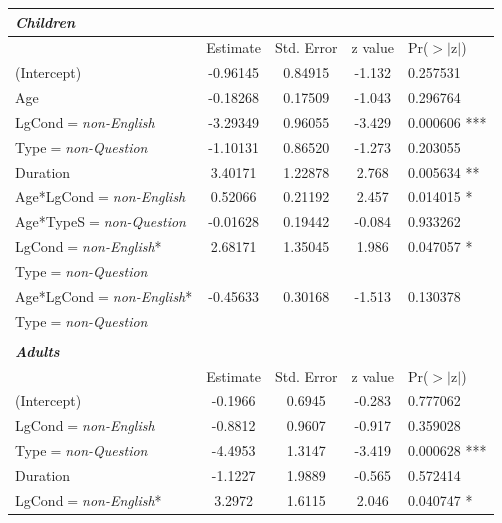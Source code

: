 \documentclass[authoryear, 12pt]{elsarticle}
\begin{document}
\begin{table}[h!]
\begin{small}
\begin{center}
  \begin{tabular}{lcccl}
  \textbf{\textit{Children}} &&&& \\
    \hline
                   & Estimate & Std. Error & z value & Pr($>$$|$z$|$)    \\
    \hline
    (Intercept)   						& -0.96145	& 0.84915		& -1.132	& 0.257531 	\\    
    Age             						& -0.18268	& 0.17509		& -1.043	& 0.296764   	\\  
    LgCond$=$\textit{non-English} 		& -3.29349	& 0.96055		& -3.429	& 0.000606 *** 	\\
    Type$=$\textit{non-Question}          	& -1.10131	& 0.86520		& -1.273	& 0.203055     	\\
    Duration      						& 3.40171		& 1.22878		&  2.768	& 0.005634  **	\\
    Age*LgCond$=$\textit{non-English} 	& 0.52066		& 0.21192		&  2.457	& 0.014015 * 	\\  
    Age*TypeS$=$\textit{non-Question}      & -0.01628	& 0.19442		& -0.084	& 0.933262     	\\
    LgCond$=$\textit{non-English}*		& 2.68171		& 1.35045		& 1.986	& 0.047057 * 	\\
    \hspace*{5mm} Type$=$\textit{non-Question} &&&& \\
    Age*LgCond$=$\textit{non-English}*	& -0.45633	& 0.30168		& -1.513	& 0.130378  \\
    \hspace*{5mm} Type$=$\textit{non-Question} &&&& \\
    \hline
  &&&& \\
  \textbf{\textit{Adults}} &&&& \\
    \hline
                       &  Estimate & Std. Error & z value & Pr($>$$|$z$|$) \\    
    \hline
    (Intercept)						& -0.1966		& 0.6945		& -0.283	& 0.777062     	\\
    LgCond$=$\textit{non-English}		& -0.8812		& 0.9607		& -0.917	& 0.359028   	\\  
    Type$=$\textit{non-Question}		& -4.4953		& 1.3147		& -3.419	& 0.000628 *** \\
    Duration						& -1.1227		& 1.9889		& -0.565	& 0.572414     	\\
    LgCond$=$\textit{non-English}*		& 3.2972		& 1.6115		& 2.046	& 0.040747 * 	\\ 

\end{tabular}
\end{center}
\end{small}
\end{table}
\end{document}
